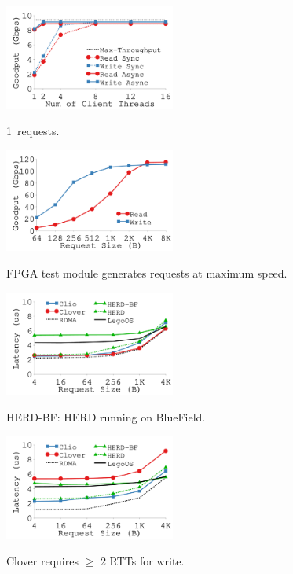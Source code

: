 {
\begin{figure}[th]
\begin{center}
\centerline{\includegraphics[width=0.5\textwidth]{clio/Figures/g_plot_throughput.pdf}}
{
1\KB\ requests. %
}
\end{center}
\end{figure}
}
{
\begin{figure}[h]
\begin{center}
\centerline{\includegraphics[width=0.5\textwidth]{clio/Figures/g_plot_onboard_throughput.pdf}}
{
FPGA test module generates requests at maximum speed.
}
\end{center}
\end{figure}
}
{
\begin{figure}[h]
\begin{center}
\centerline{\includegraphics[width=0.5\textwidth]{clio/Figures/g_plot_read_latency.pdf}}
{
HERD-BF: HERD running on BlueField. %
}
\end{center}
\end{figure}
}
{
\begin{figure}[h]
\begin{center}
\centerline{\includegraphics[width=0.5\textwidth]{clio/Figures/g_plot_write_latency.pdf}}
{
Clover requires $\ge$ 2 RTTs for write.
}
\end{center}
\end{figure}
}